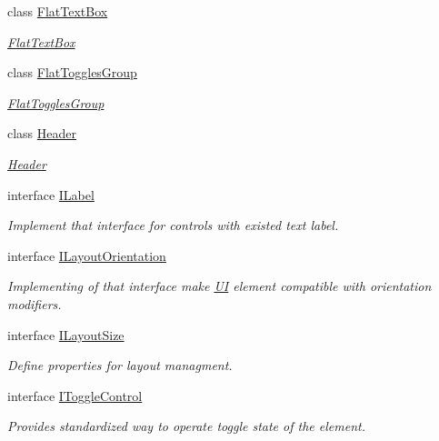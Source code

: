 \begin{DoxyCompactItemize}
class \mbox{\hyperlink{class_wpf_handler_1_1_u_i_1_1_controls_1_1_flat_text_box}{Flat\+Text\+Box}}
\begin{DoxyCompactList}\small\item\em \mbox{\hyperlink{class_wpf_handler_1_1_u_i_1_1_controls_1_1_flat_text_box}{Flat\+Text\+Box}} \end{DoxyCompactList}\item 
class \mbox{\hyperlink{class_wpf_handler_1_1_u_i_1_1_controls_1_1_flat_toggles_group}{Flat\+Toggles\+Group}}
\begin{DoxyCompactList}\small\item\em \mbox{\hyperlink{class_wpf_handler_1_1_u_i_1_1_controls_1_1_flat_toggles_group}{Flat\+Toggles\+Group}} \end{DoxyCompactList}\item 
class \mbox{\hyperlink{class_wpf_handler_1_1_u_i_1_1_controls_1_1_header}{Header}}
\begin{DoxyCompactList}\small\item\em \mbox{\hyperlink{class_wpf_handler_1_1_u_i_1_1_controls_1_1_header}{Header}} \end{DoxyCompactList}\item 
interface \mbox{\hyperlink{interface_wpf_handler_1_1_u_i_1_1_controls_1_1_i_label}{I\+Label}}
\begin{DoxyCompactList}\small\item\em Implement that interface for controls with existed text label. \end{DoxyCompactList}\item 
interface \mbox{\hyperlink{interface_wpf_handler_1_1_u_i_1_1_controls_1_1_i_layout_orientation}{I\+Layout\+Orientation}}
\begin{DoxyCompactList}\small\item\em Implementing of that interface make \mbox{\hyperlink{namespace_wpf_handler_1_1_u_i}{UI}} element compatible with orientation modifiers. \end{DoxyCompactList}\item 
interface \mbox{\hyperlink{interface_wpf_handler_1_1_u_i_1_1_controls_1_1_i_layout_size}{I\+Layout\+Size}}
\begin{DoxyCompactList}\small\item\em Define properties for layout managment. \end{DoxyCompactList}\item 
interface \mbox{\hyperlink{interface_wpf_handler_1_1_u_i_1_1_controls_1_1_i_toggle_control}{I\+Toggle\+Control}}
\begin{DoxyCompactList}\small\item\em Provides standardized way to operate toggle state of the element. \end{DoxyCompactList}\item 

\end{DoxyCompactItemize}
